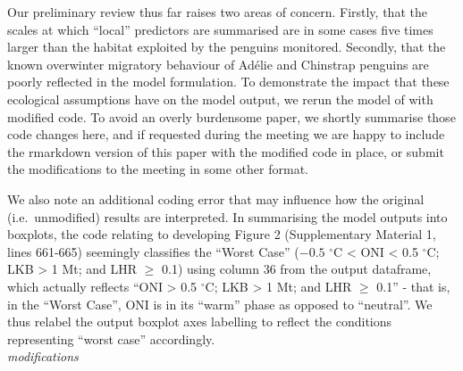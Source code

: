 \documentclass[]{elsarticle} %
\begin{document}
Our preliminary review thus far raises two areas of concern. Firstly,
that the scales at which ``local'' predictors are summarised are in some
cases five times larger than the habitat exploited by the penguins
monitored. Secondly, that the known overwinter migratory behaviour of
Adélie and Chinstrap penguins are poorly reflected in the model
formulation. To demonstrate the impact that these ecological assumptions
have on the model output, we rerun the model of \citet{Watters2020} with
modified code. To avoid an overly burdensome paper, we shortly summarise
those code changes here, and if requested during the meeting we are
happy to include the rmarkdown version of this paper with the modified
code in place, or submit the modifications to the meeting in some other
format.

We also note an additional coding error that may influence how the
original (i.e.~unmodified) results are interpreted. In summarising the
model outputs into boxplots, the code relating to developing Figure 2
(Supplementary Material 1, lines 661-665) seemingly classifies the
``Worst Case'' (\({-0.5}\) \(^{\circ}\)C \textless{} ONI \textless{} 0.5
\(^{\circ}\)C; LKB \textgreater{} 1 Mt; and LHR \(\geqslant\) 0.1) using
column 36 from the output dataframe, which actually reflects ``ONI
\textgreater{} 0.5 \(^{\circ}\)C; LKB \textgreater{} 1 Mt; and LHR
\(\geqslant\) 0.1'' - that is, in the ``Worst Case'', ONI is in its
``warm'' phase as opposed to ``neutral''. We thus relabel the output
boxplot axes labelling to reflect the conditions representing ``worst
case'' accordingly.\\
\newline \emph{modifications}
\end{document}
